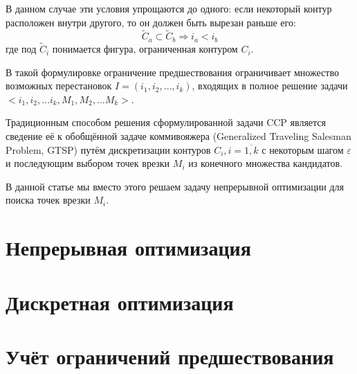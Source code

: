 \documentclass{article}
\begin{document}
В данном случае эти условия упрощаются до одного:
если некоторый контур расположен внутри другого,
то он должен быть вырезан раньше его:
$$
\tilde C_a \subset \tilde C_b
\Rightarrow
i_a < i_b
$$
где под
$\tilde C_i$ понимается фигура,
ограниченная контуром $C_i$.

В такой формулировке ограничение предшествования
ограничивает множество возможных перестановок
$I=(i_1, i_2, \dots, i_k)$,
входящих в полное решение задачи
$\big<
i_1, i_2, \dots i_k,
M_1, M_2, \dots M_k
\big>$.

Традиционным способом решения сформулированной задачи CCP
является сведение её к обобщённой задаче коммивояжера
(Generalized Traveling Salesman Problem, GTSP)
путём дискретизации контуров
$C_i, i=\overline{1, k}$
с некоторым шагом $\varepsilon$
и последующим выбором точек врезки
$M_i$ из конечного множества кандидатов.

В данной статье мы вместо этого решаем задачу непрерывной оптимизации
для поиска точек врезки $M_i$.

\section{Непрерывная оптимизация}

\section{Дискретная оптимизация}

\section{Учёт ограничений предшествования}
\end{document}
